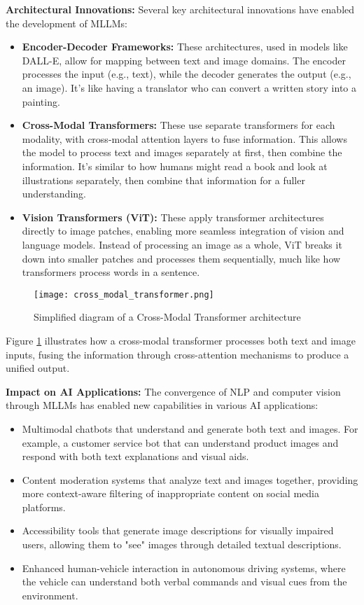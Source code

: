 \textbf{Architectural Innovations:}
Several key architectural innovations have enabled the development of MLLMs:

\begin{itemize}
    \item \textbf{Encoder-Decoder Frameworks:} These architectures, used in models like DALL-E, allow for mapping between text and image domains. The encoder processes the input (e.g., text), while the decoder generates the output (e.g., an image). It's like having a translator who can convert a written story into a painting.
    
    \item \textbf{Cross-Modal Transformers:} These use separate transformers for each modality, with cross-modal attention layers to fuse information. This allows the model to process text and images separately at first, then combine the information. It's similar to how humans might read a book and look at illustrations separately, then combine that information for a fuller understanding.
    
    \item \textbf{Vision Transformers (ViT):} These apply transformer architectures directly to image patches, enabling more seamless integration of vision and language models. Instead of processing an image as a whole, ViT breaks it down into smaller patches and processes them sequentially, much like how transformers process words in a sentence.
\end{itemize}

\begin{figure}[h]
    \centering
    \texttt{[image: cross\_modal\_transformer.png]}
    \caption{Simplified diagram of a Cross-Modal Transformer architecture}
    \label{fig:cross_modal_transformer}
\end{figure}

Figure \ref{fig:cross_modal_transformer} illustrates how a cross-modal transformer processes both text and image inputs, fusing the information through cross-attention mechanisms to produce a unified output.

\textbf{Impact on AI Applications:}
The convergence of NLP and computer vision through MLLMs has enabled new capabilities in various AI applications:

\begin{itemize}
    \item Multimodal chatbots that understand and generate both text and images. For example, a customer service bot that can understand product images and respond with both text explanations and visual aids.
    \item Content moderation systems that analyze text and images together, providing more context-aware filtering of inappropriate content on social media platforms.
    \item Accessibility tools that generate image descriptions for visually impaired users, allowing them to "see" images through detailed textual descriptions.
    \item Enhanced human-vehicle interaction in autonomous driving systems, where the vehicle can understand both verbal commands and visual cues from the environment.
\end{itemize}

